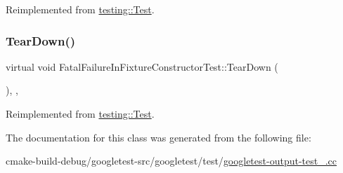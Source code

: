 Reimplemented from \mbox{\hyperlink{classtesting_1_1Test_a190315150c303ddf801313fd1a777733}{testing\+::\+Test}}.

\mbox{\label{classFatalFailureInFixtureConstructorTest_a2763026a557e1fce4e59bd16c4eced57}} 
\subsubsection{\texorpdfstring{TearDown()}{TearDown()}}
{\footnotesize\ttfamily virtual void Fatal\+Failure\+In\+Fixture\+Constructor\+Test\+::\+Tear\+Down (\begin{DoxyParamCaption}{ }\end{DoxyParamCaption})\hspace{0.3cm}{\ttfamily [inline]}, {\ttfamily [protected]}, {\ttfamily [virtual]}}



Reimplemented from \mbox{\hyperlink{classtesting_1_1Test_a5f0ab439802cbe0ef7552f1a9f791923}{testing\+::\+Test}}.



The documentation for this class was generated from the following file\+:\begin{DoxyCompactItemize}
\item 
cmake-\/build-\/debug/googletest-\/src/googletest/test/\mbox{\hyperlink{googletest-output-test___8cc}{googletest-\/output-\/test\+\_\+.\+cc}}\end{DoxyCompactItemize}
